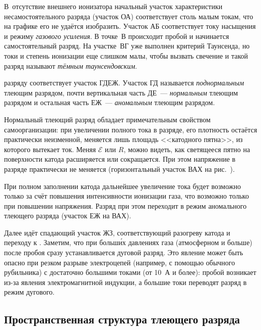 В~отсутствие внешнего ионизатора начальный участок
характеристики несамостоятельного разряда (участок ОА) соответствует столь
малым токам, что на графике его не удаётся изобразить. Участок 
АБ соответствует току насыщения и режиму \emph{газового усиления}. 
В точке~В происходит пробой и начинается самостоятельный
разряд. На участке~ВГ уже выполнен критерий Таунсенда, но 
токи и степень ионизации еще слишком малы, чтобы вызвать свечение 
и такой разряд называют \emph{тёмным таунсендовским}.

 разряду соответствует участок ГДЕЖ.
Участок ГД называется \emph{поднормальным} тлеющим разрядом,
почти вертикальная часть ДЕ~--- \emph{нормальным} тлеющим разрядом и
остальная часть ЕЖ~--- \emph{аномальным} тлеющим разрядом.

Нормальный тлеющий разряд обладает примечательным свойством самоорганизации:
при увеличении полного тока в разряде, его плотность остаётся практически
неизменной, меняется лишь площадь <<катодного пятна>>, из которого вытекает ток.
Меняя $\mathcal{E}$ или $R$, можно видеть, как светящееся пятно
на поверхности катода расширяется или сокращается.
При этом напряжение в разряде практически не меняется
(горизонтальный участок ВАХ на рис.~).

При полном заполнении катода дальнейшее увеличение тока будет возможно только за
счёт повышения интенсивности ионизации газа, что возможно только при повышении
напряжения. Разряд при этом переходит в режим аномального тлеющего разряда
(участок ЕЖ на ВАХ).

Далее идёт спадающий участок ЖЗ, соответствующий разогреву катода и 
переходу к . Заметим, что при больш\'{и}х давлениях газа
(атмосферном и больше) после пробоя сразу устанавливается дуговой разряд.
Это явление может быть опасно при резком разрыве электроцепей (например, с помощью
обычного рубильника) с достаточно большими токами (от 10~А и более): пробой
возникает из-за явления электромагнитной индукции, а большие токи 
переводят разряд в режим дугового.

\subsection*{Пространственная структура тлеющего разряда}


